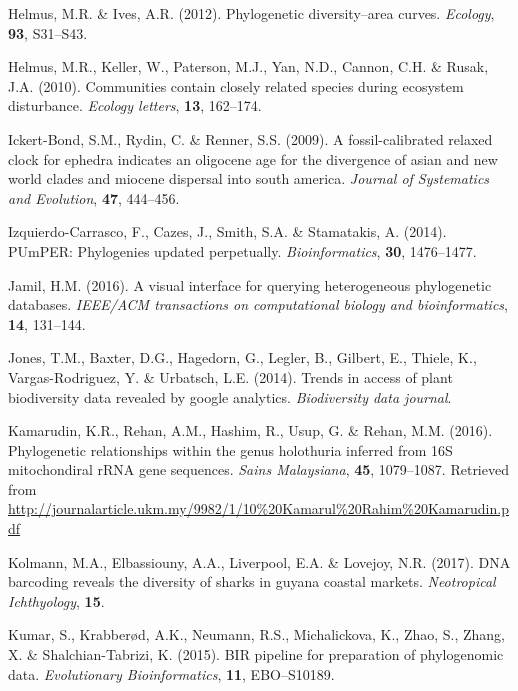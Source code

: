 \documentclass[]{article}
\begin{document}
\leavevmode\hypertarget{ref-helmus2012phylogenetic}{}%
Helmus, M.R. \& Ives, A.R. (2012). Phylogenetic diversity--area curves. \emph{Ecology}, \textbf{93}, S31--S43.

\leavevmode\hypertarget{ref-helmus2010communities}{}%
Helmus, M.R., Keller, W., Paterson, M.J., Yan, N.D., Cannon, C.H. \& Rusak, J.A. (2010). Communities contain closely related species during ecosystem disturbance. \emph{Ecology letters}, \textbf{13}, 162--174.

\leavevmode\hypertarget{ref-ickert2009fossil}{}%
Ickert-Bond, S.M., Rydin, C. \& Renner, S.S. (2009). A fossil-calibrated relaxed clock for ephedra indicates an oligocene age for the divergence of asian and new world clades and miocene dispersal into south america. \emph{Journal of Systematics and Evolution}, \textbf{47}, 444--456.

\leavevmode\hypertarget{ref-izquierdo2014pumper}{}%
Izquierdo-Carrasco, F., Cazes, J., Smith, S.A. \& Stamatakis, A. (2014). PUmPER: Phylogenies updated perpetually. \emph{Bioinformatics}, \textbf{30}, 1476--1477.

\leavevmode\hypertarget{ref-jamil2016visual}{}%
Jamil, H.M. (2016). A visual interface for querying heterogeneous phylogenetic databases. \emph{IEEE/ACM transactions on computational biology and bioinformatics}, \textbf{14}, 131--144.

\leavevmode\hypertarget{ref-jones2014trends}{}%
Jones, T.M., Baxter, D.G., Hagedorn, G., Legler, B., Gilbert, E., Thiele, K., Vargas-Rodriguez, Y. \& Urbatsch, L.E. (2014). Trends in access of plant biodiversity data revealed by google analytics. \emph{Biodiversity data journal}.

\leavevmode\hypertarget{ref-kamarudin2016phylogenetic}{}%
Kamarudin, K.R., Rehan, A.M., Hashim, R., Usup, G. \& Rehan, M.M. (2016). Phylogenetic relationships within the genus holothuria inferred from 16S mitochondiral rRNA gene sequences. \emph{Sains Malaysiana}, \textbf{45}, 1079--1087. Retrieved from \url{http://journalarticle.ukm.my/9982/1/10\%20Kamarul\%20Rahim\%20Kamarudin.pdf}

\leavevmode\hypertarget{ref-kolmann2017dna}{}%
Kolmann, M.A., Elbassiouny, A.A., Liverpool, E.A. \& Lovejoy, N.R. (2017). DNA barcoding reveals the diversity of sharks in guyana coastal markets. \emph{Neotropical Ichthyology}, \textbf{15}.

\leavevmode\hypertarget{ref-kumar2015bir}{}%
Kumar, S., Krabberød, A.K., Neumann, R.S., Michalickova, K., Zhao, S., Zhang, X. \& Shalchian-Tabrizi, K. (2015). BIR pipeline for preparation of phylogenomic data. \emph{Evolutionary Bioinformatics}, \textbf{11}, EBO--S10189.
\end{document}
